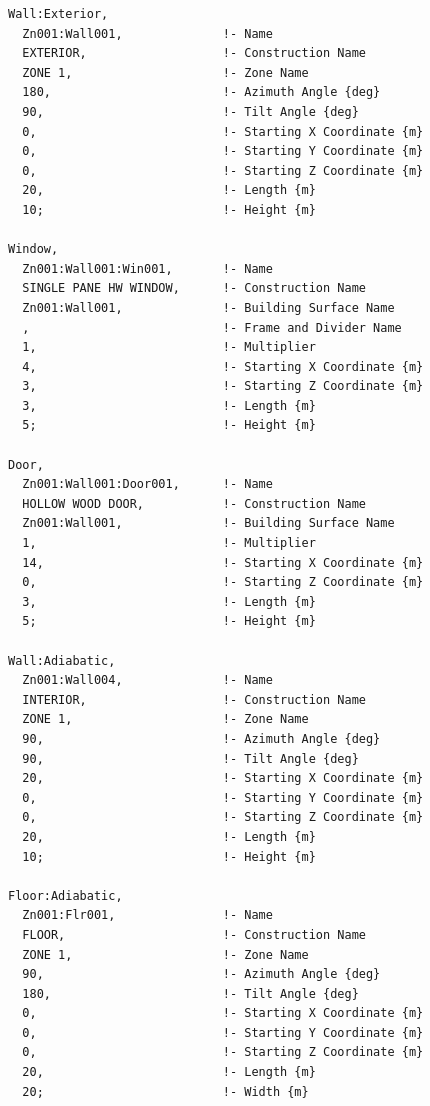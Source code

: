 \begin{lstlisting}
Wall:Exterior,
  Zn001:Wall001,              !- Name
  EXTERIOR,                   !- Construction Name
  ZONE 1,                     !- Zone Name
  180,                        !- Azimuth Angle {deg}
  90,                         !- Tilt Angle {deg}
  0,                          !- Starting X Coordinate {m}
  0,                          !- Starting Y Coordinate {m}
  0,                          !- Starting Z Coordinate {m}
  20,                         !- Length {m}
  10;                         !- Height {m}

Window,
  Zn001:Wall001:Win001,       !- Name
  SINGLE PANE HW WINDOW,      !- Construction Name
  Zn001:Wall001,              !- Building Surface Name
  ,                           !- Frame and Divider Name
  1,                          !- Multiplier
  4,                          !- Starting X Coordinate {m}
  3,                          !- Starting Z Coordinate {m}
  3,                          !- Length {m}
  5;                          !- Height {m}

Door,
  Zn001:Wall001:Door001,      !- Name
  HOLLOW WOOD DOOR,           !- Construction Name
  Zn001:Wall001,              !- Building Surface Name
  1,                          !- Multiplier
  14,                         !- Starting X Coordinate {m}
  0,                          !- Starting Z Coordinate {m}
  3,                          !- Length {m}
  5;                          !- Height {m}

Wall:Adiabatic,
  Zn001:Wall004,              !- Name
  INTERIOR,                   !- Construction Name
  ZONE 1,                     !- Zone Name
  90,                         !- Azimuth Angle {deg}
  90,                         !- Tilt Angle {deg}
  20,                         !- Starting X Coordinate {m}
  0,                          !- Starting Y Coordinate {m}
  0,                          !- Starting Z Coordinate {m}
  20,                         !- Length {m}
  10;                         !- Height {m}

Floor:Adiabatic,
  Zn001:Flr001,               !- Name
  FLOOR,                      !- Construction Name
  ZONE 1,                     !- Zone Name
  90,                         !- Azimuth Angle {deg}
  180,                        !- Tilt Angle {deg}
  0,                          !- Starting X Coordinate {m}
  0,                          !- Starting Y Coordinate {m}
  0,                          !- Starting Z Coordinate {m}
  20,                         !- Length {m}
  20;                         !- Width {m}


\end{lstlisting}
